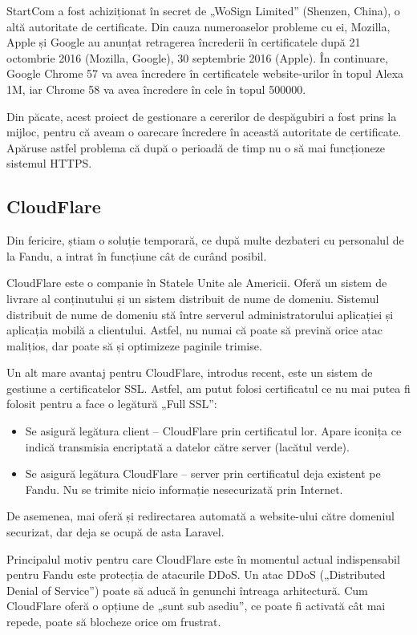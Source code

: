 		StartCom a fost achiziționat în secret de „WoSign Limited” (Shenzen, China), o altă autoritate de certificate.
		Din cauza numeroaselor probleme cu ei, Mozilla, Apple și Google au anunțat retragerea încrederii în certificatele după 21 octombrie 2016 (Mozilla, Google), 30 septembrie 2016 (Apple).
		În continuare, Google Chrome 57 va avea încredere în certificatele website-urilor în topul Alexa 1M, iar Chrome 58 va avea încredere în cele în topul 500000. \cite{chrome_wosign}

		Din păcate, acest proiect de gestionare a cererilor de despăgubiri a fost prins la mijloc, pentru că aveam o oarecare încredere în această autoritate de certificate.
		Apăruse astfel problema că după o perioadă de timp nu o să mai funcționeze sistemul HTTPS.

	\subsection{CloudFlare}

		Din fericire, știam o soluție temporară, ce după multe dezbateri cu personalul de la Fandu, a intrat în funcțiune cât de curând posibil.

		CloudFlare este o companie în Statele Unite ale Americii.
		Oferă un sistem de livrare al conținutului și un sistem distribuit de nume de domeniu.
		Sistemul distribuit de nume de domeniu stă între serverul administratorului aplicației și aplicația mobilă a clientului.
		Astfel, nu numai că poate să prevină orice atac malițios, dar poate să și optimizeze paginile trimise.

		Un alt mare avantaj pentru CloudFlare, introdus recent, este un sistem de gestiune a certificatelor SSL.
		Astfel, am putut folosi certificatul ce nu mai putea fi folosit pentru a face o legătură „Full SSL”:
		\begin{itemize}
			\item
			Se asigură legătura client -- CloudFlare prin certificatul lor.
			Apare iconița ce indică transmisia encriptată a datelor către server (lacătul verde).
			\item
			Se asigură legătura CloudFlare -- server prin certificatul deja existent pe Fandu.
			Nu se trimite nicio informație nesecurizată prin Internet.
		\end{itemize}

		De asemenea, mai oferă și redirectarea automată a website-ului către domeniul securizat, dar deja se ocupă de asta Laravel.

		Principalul motiv pentru care CloudFlare este în momentul actual indispensabil pentru Fandu este protecția de atacurile DDoS.
		Un atac DDoS („Distributed Denial of Service”) poate să aducă în genunchi întreaga arhitectură.
		Cum CloudFlare oferă o opțiune de „sunt sub asediu”, ce poate fi activată cât mai repede, poate să blocheze orice om frustrat.

